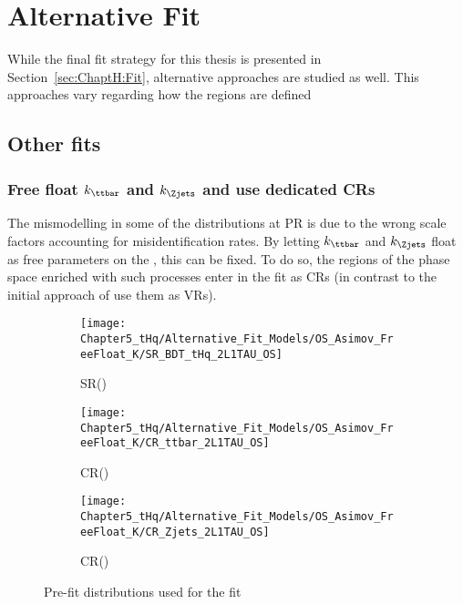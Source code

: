 \chapter{Alternative Fit}
\label{chap:Appendix:AlternativeFit}

\FloatBarrier


While the final fit strategy for this thesis is presented in Section~\ref{sec:ChaptH:Fit},
alternative approaches are studied as well.  This approaches vary regarding how
the regions are defined


\section{Other \dilepOStau fits}

\subsection{Free float $k_{\ttbar}$ and $k_{\Zjets}$ and use dedicated CRs}
The mismodelling in some of the distributions at PR
is due to the wrong scale factors accounting for misidentification rates.
By letting $k_{\ttbar}$ and $k_{\Zjets}$ float as free parameters on the \dilepOStau, 
this can be fixed. To do so, the regions of the phase space enriched with such
processes enter in the fit as CRs (in contrast to the initial approach of use them as VRs).


\begin{figure}[h]
\centering
\begin{subfigure}{.3\textwidth}
  \centering
  \texttt{[image: Chapter5\_tHq/Alternative\_Fit\_Models/OS\_Asimov\_FreeFloat\_K/SR\_BDT\_tHq\_2L1TAU\_OS]}
  \caption{SR(\tHq)}
\end{subfigure}%
\begin{subfigure}{.3\textwidth}
  \centering
  \texttt{[image: Chapter5\_tHq/Alternative\_Fit\_Models/OS\_Asimov\_FreeFloat\_K/CR\_ttbar\_2L1TAU\_OS]}
  \caption{CR(\ttbar)}
\end{subfigure}
\begin{subfigure}{.3\textwidth}
  \centering
  \texttt{[image: Chapter5\_tHq/Alternative\_Fit\_Models/OS\_Asimov\_FreeFloat\_K/CR\_Zjets\_2L1TAU\_OS]}
  \caption{CR(\Zjets)}
\end{subfigure}
\caption{Pre-fit distributions used for the \dilepOStau fit}
\label{fig:Alternative:PreFit:OS:VRs}
\end{figure}

